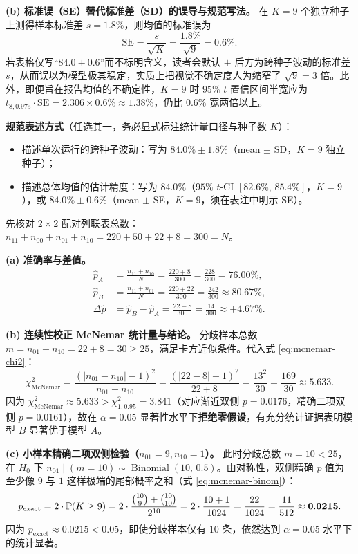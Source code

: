 \textbf{(b) 标准误（SE）替代标准差（SD）的误导与规范写法。}
在 $K = 9$ 个独立种子上测得样本标准差 $s = 1.8\%$，则均值的标准误为
\[
  \mathrm{SE} = \frac{s}{\sqrt{K}} = \frac{1.8\%}{\sqrt{9}} = 0.6\%.
\]
若表格仅写“$84.0 \pm 0.6$”而不标明含义，读者会默认 $\pm$ 后方为跨种子波动的标准差 $s$，从而误以为模型极其稳定，实质上把视觉不确定度人为缩窄了 $\sqrt{9} = 3$ 倍。此外，即便旨在报告均值的不确定性，$K = 9$ 时 $95\%$ $t$ 置信区间半宽应为 $t_{8,0.975}\cdot\mathrm{SE} = 2.306 \times 0.6\% \approx 1.38\%$，仍比 $0.6\%$ 宽两倍以上。

\textbf{规范表述方式}（任选其一，务必显式标注统计量口径与种子数 $K$）：
\begin{itemize}
  \item 描述单次运行的跨种子波动：写为 $84.0\% \pm 1.8\%$（mean $\pm$ SD，$K = 9$ 独立种子）；
  \item 描述总体均值的估计精度：写为 $84.0\%$（$95\%$ $t$-CI $[82.6\%,\, 85.4\%]$，$K = 9$），或 $84.0\% \pm 0.6\%$（mean $\pm$ SE，$K = 9$，须在表注中明示 SE）。
\end{itemize}


先核对 $2\times 2$ 配对列联表总数：$n_{11} + n_{00} + n_{01} + n_{10} = 220 + 50 + 22 + 8 = 300 = N$。

\textbf{(a) 准确率与差值。}
\begin{align*}
  \hat{p}_A &= \frac{n_{11} + n_{10}}{N} = \frac{220 + 8}{300} = \frac{228}{300} = \mathbf{76.00\%}, \\
  \hat{p}_B &= \frac{n_{11} + n_{01}}{N} = \frac{220 + 22}{300} = \frac{242}{300} \approx \mathbf{80.67\%}, \\
  \Delta \hat{p} &= \hat{p}_B - \hat{p}_A = \frac{22 - 8}{300} = \frac{14}{300} \approx \mathbf{+4.67\%}.
\end{align*}

\textbf{(b) 连续性校正 McNemar 统计量与结论。}
分歧样本总数 $m = n_{01} + n_{10} = 22 + 8 = 30 \ge 25$，满足卡方近似条件。代入式 \eqref{eq:mcnemar-chi2}：
\[
  \chi^2_{\mathrm{McNemar}}
  = \frac{(|n_{01} - n_{10}| - 1)^2}{n_{01} + n_{10}}
  = \frac{(|22 - 8| - 1)^2}{22 + 8}
  = \frac{13^2}{30}
  = \frac{169}{30} \approx \mathbf{5.633}.
\]
因为 $\chi^2_{\mathrm{McNemar}} \approx 5.633 > \chi^2_{1,0.95} = 3.841$（对应渐近双侧 $p = 0.0176$，精确二项双侧 $p = 0.0161$），故在 $\alpha = 0.05$ 显著性水平下\textbf{拒绝零假设}，有充分统计证据表明模型 $B$ 显著优于模型 $A$。

\textbf{(c) 小样本精确二项双侧检验（$n_{01}=9, n_{10}=1$）。}
此时分歧总数 $m = 10 < 25$，在 $H_0$ 下 $n_{01} \mid (m = 10) \sim \operatorname{Binomial}(10,\, 0.5)$。由对称性，双侧精确 $p$ 值为至少像 $9$ 与 $1$ 这样极端的尾部概率之和（式 \eqref{eq:mcnemar-binom}）：
\[
  p_{\text{exact}}
  = 2 \cdot \mathbb{P}(K \ge 9)
  = 2 \cdot \frac{\binom{10}{9} + \binom{10}{10}}{2^{10}}
  = 2 \cdot \frac{10 + 1}{1024}
  = \frac{22}{1024}
  = \frac{11}{512} \approx \mathbf{0.0215}.
\]
因为 $p_{\text{exact}} \approx 0.0215 < 0.05$，即使分歧样本仅有 $10$ 条，依然达到 $\alpha = 0.05$ 水平下的统计显著。

